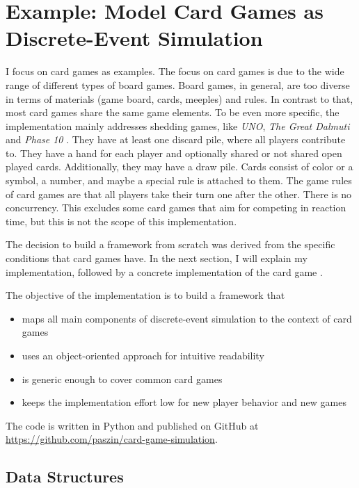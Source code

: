 
\section{Example: Model Card Games as Discrete-Event Simulation}


I focus on card games as examples. The focus on card games is due to the wide range of different types of board games. Board games, in general, are too diverse in terms of materials (game board, cards, meeples) and rules. In contrast to that, most card games share the same game elements. To be even more specific, the implementation mainly addresses shedding games, like \textit{UNO}, \textit{The Great Dalmuti} and \textit{Phase 10} \cite{wiki:sheddinglist}. They have at least one discard pile, where all players contribute to. They have a hand for each player and optionally shared or not shared open played cards. Additionally, they may have a draw pile. Cards consist of color or a symbol, a number, and maybe a special rule is attached to them.
The game rules of card games are that all players take their turn one after the other. There is no concurrency. This excludes some card games that aim for competing in reaction time, but this is not the scope of this implementation.

The decision to build a framework from scratch was derived from the specific conditions that card games have.
In the next section, I will explain my implementation, followed by a concrete implementation of the card game \uno.

The objective of the implementation is to build a framework that

\begin{itemize}
\item maps all main components of discrete-event simulation to the context of card games
\item uses an object-oriented approach for intuitive readability
\item is generic enough to cover common card games
\item keeps the implementation effort low for new player behavior and new games
\end{itemize}

The code is written in Python and published on GitHub at \url{https://github.com/paszin/card-game-simulation}.

\subsection{Data Structures}


